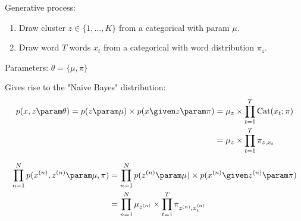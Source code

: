 \begin{frame}

\vspace{0.25cm}

Generative process: 
\begin{enumerate}
\item Draw cluster $z \in \{1, \ldots, K\}$ from a categorical with param $\mu$.
\item Draw word $T$ words $x_t$ from a categorical with word distribution $\pi_{z}$.
\end{enumerate}
\air
Parameters: $\theta = \{\mu, \pi\}$

\air



Gives rise to the "Naive Bayes" distribution:
\begin{align*}
     p(x, z \param \theta) = p(z \param \mu) \times p(x \given z \param \pi) &= \mu_z \times \prod_{t=1}^T \text{Cat}(x_t ; \pi)\\ 
     &=  \mu_{z} \times  \prod_{t=1}^T \pi_{z, x_t}
\end{align*}
\end{frame}


\begin{frame}

\begin{center}

\end{center}

\air


\begin{align*}
     \prod_{n=1}^N p(x^{(n)}, z^{(n)} \param \mu, \pi) &= \prod_{n=1}^N p(z^{(n)} \param \mu) \times p(x^{(n)} \given z^{(n)} \param \pi) \\
     &= \prod_{n=1}^N \mu_{z^{(n)}}   \times \prod_{t=1}^T \pi_{z^{(n)},  x^{(n)}_t}
\end{align*}
\end{frame}





